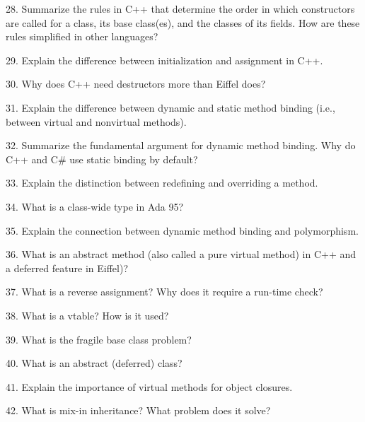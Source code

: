 28. Summarize the rules in C++ that determine the order in which constructors are called for a class, its base class(es), and the classes of its fields. How are these rules simplified in other languages?

\filbreak
\vskip 1cm

29. Explain the difference between initialization and assignment in C++.

\filbreak
\vskip 1cm

30. Why does C++ need destructors more than Eiffel does?

\filbreak
\vskip 1cm

31. Explain the difference between dynamic and static method binding (i.e., between virtual and nonvirtual methods).

\filbreak
\vskip 1cm

32. Summarize the fundamental argument for dynamic method binding. Why do C++ and C$\#$ use static binding by default?

\filbreak
\vskip 1cm

33. Explain the distinction between redefining and overriding a method.

\filbreak
\vskip 1cm

34. What is a class-wide type in Ada 95?

\filbreak
\vskip 1cm

35. Explain the connection between dynamic method binding and polymorphism.

\filbreak
\vskip 1cm

36. What is an abstract method (also called a pure virtual method) in C++ and a deferred feature in Eiffel)?


\filbreak
\vskip 1cm

37. What is a reverse assignment? Why does it require a run-time check?

\filbreak
\vskip 1cm

38. What is a vtable? How is it used?

\filbreak
\vskip 1cm

39. What is the fragile base class problem?

\filbreak
\vskip 1cm

40. What is an abstract (deferred) class?

\filbreak
\vskip 1cm

41. Explain the importance of virtual methods for object closures.

\filbreak
\vskip 1cm

42. What is mix-in inheritance? What problem does it solve?

